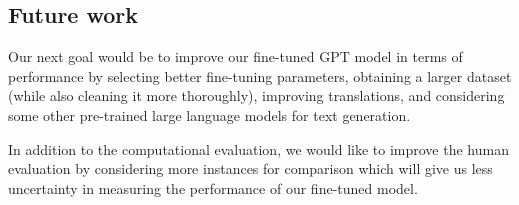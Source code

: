 \documentclass[fleqn,moreauthors,10pt]{ds_report}
\begin{document}
\subsection*{Future work}
Our next goal would be to improve our fine-tuned GPT model in terms of performance by selecting better fine-tuning parameters, obtaining a larger dataset (while also cleaning it more thoroughly), improving translations, and considering some other pre-trained large language models for text generation.
\par
In addition to the computational evaluation, we would like to improve the human evaluation by considering more instances for comparison which will give us less uncertainty in measuring the performance of our fine-tuned model.




\end{document}

